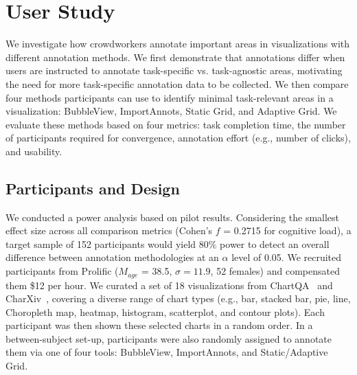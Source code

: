 

\section{User Study}

We investigate how crowdworkers annotate important areas in visualizations with different annotation methods. We first demonstrate that annotations differ when users are instructed to annotate task-specific vs. task-agnostic areas, motivating the need for more task-specific annotation data to be collected. We then compare four methods participants can use to identify minimal task-relevant areas in a visualization: BubbleView, ImportAnnots, Static Grid, and Adaptive Grid. We evaluate these methods based on four metrics: task completion time, the number of participants required for convergence, annotation effort (e.g., number of clicks), and usability.

\subsection{Participants and Design}

We conducted a power analysis based on pilot results. Considering the smallest effect size across all comparison metrics (Cohen's $f$ = 0.2715 for cognitive load), a target sample of 152 participants would yield 80\% power to detect an overall difference between annotation methodologies at an $\alpha$ level of 0.05. 
We recruited participants from Prolific ($M_{age}$ = 38.5, $\sigma = 11.9$, 52 females) and compensated them \$12 per hour. 
We curated a set of 18 visualizations from ChartQA~\cite{chartQA} and CharXiv~\cite{charxiv}, covering a diverse range of chart types (e.g., bar, stacked bar, pie, line, Choropleth map, heatmap, histogram, scatterplot, and contour plots). Each participant was then shown these selected charts in a random order. 
In a between-subject set-up, participants were also randomly assigned to annotate them via one of four tools: BubbleView, ImportAnnots, and Static/Adaptive Grid.


